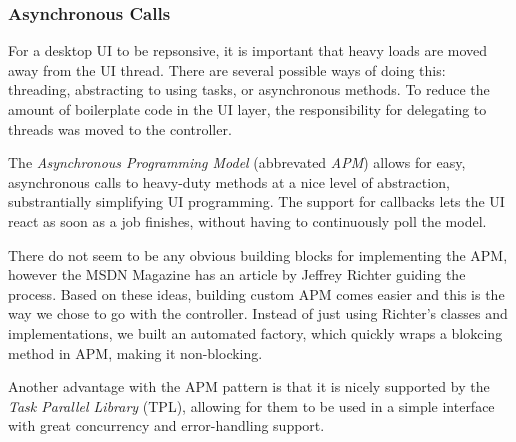 \subsubsection{Asynchronous Calls}
\label{sec:APM}

For a desktop UI to be repsonsive, it is important that heavy loads are moved away from the UI thread. There are several possible ways of doing this: threading, abstracting to using tasks, or asynchronous methods. To reduce the amount of boilerplate code in the UI layer, the responsibility for delegating to threads was moved to the controller.

The \emph{Asynchronous Programming Model}\cite{msdnAPMdoc} (abbrevated \emph{APM}) allows for easy, asynchronous calls to heavy-duty methods at a nice level of abstraction, substrantially simplifying UI programming. The support for callbacks lets the UI react as soon as a job finishes, without having to continuously poll the model.

There do not seem to be any obvious building blocks for implementing the APM, however the MSDN Magazine\cite{richtermsdn0307} has an article by Jeffrey Richter guiding the process. Based on these ideas, building custom APM comes easier and this is the way we chose to go with the controller. Instead of just using Richter's classes and implementations, we built an automated factory, which quickly wraps a blokcing method in APM, making it non-blocking.

Another advantage with the APM pattern is that it is nicely supported by the \emph{Task Parallel Library}\cite[p.~656]{Griffiths2010} (TPL), allowing for them to be used in a simple interface with great concurrency and error-handling support.